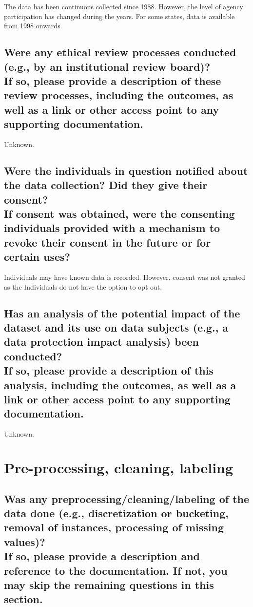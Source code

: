 \documentclass[letterpaper, 10 pt, conference]{ieeeconf}  %
\newcommand{\subtitle}[1]{{\\ \small \normalfont \color{purple} #1}}
\begin{document}
The data has been continuous collected since 1988. However, the level of agency participation has changed during the years. For some states, data is available from 1998 onwards. 

\subsection{Were any ethical review processes conducted (e.g., by an institutional review board)? \subtitle{If so, please provide a description of these review processes, including the outcomes, as well as a link or other access point to any supporting documentation.}}

Unknown.

\subsection{Were the individuals in question notified about the data collection? Did they give their consent? \subtitle{If consent was obtained, were the consenting individuals provided with a mechanism to revoke their consent in the future or for certain uses?}}

Individuals may have known data is recorded. However, consent was not granted as the Individuals do not have the option to opt out.  

\subsection{Has an analysis of the potential impact of the dataset and its use on data subjects (e.g., a data protection impact analysis) been conducted? \subtitle{If so, please provide a description of this analysis, including the outcomes, as well as a link or other access point to any supporting documentation.}}

Unknown.


\section{Pre-processing, cleaning, labeling}

\subsection{Was any preprocessing/cleaning/labeling of the data done (e.g., discretization or bucketing, removal of instances, processing of missing values)? \subtitle{If so, please provide a description and reference to the documentation. If not, you may skip the remaining questions in this section.}}
\end{document}
